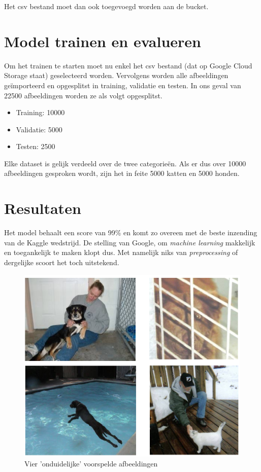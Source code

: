 Het csv bestand moet dan ook toegevoegd worden aan de bucket.

\section{Model trainen en evalueren}
\label{sec:google-automl-train}

Om het trainen te starten moet nu enkel het csv bestand (dat op Google Cloud Storage staat) geselecteerd worden. Vervolgens worden alle afbeeldingen geïmporteerd en opgesplitst in training, validatie en testen. In ons geval van 22500 afbeeldingen worden ze als volgt opgesplitst.

\begin{itemize}
    \item Training: 10000
    \item Validatie: 5000
    \item Testen: 2500
\end{itemize}

Elke dataset is gelijk verdeeld over de twee categorieën. Als er dus over 10000 afbeeldingen gesproken wordt, zijn het in feite 5000 katten en 5000 honden.

\section{Resultaten}
\label{sec:google-automl-results}

Het model behaalt een score van 99\% en komt zo overeen met de beste inzending van de Kaggle wedstrijd. De stelling van Google, om \textit{machine learning} makkelijk en toegankelijk te maken klopt dus. Met namelijk niks van \textit{preprocessing} of dergelijke scoort het toch uitstekend.

\begin{figure}
    \centering
    \includegraphics[width=\linewidth]{img/google-automl-pred.png}
    \caption{Vier 'onduidelijke' voorspelde afbeeldingen}
    \label{fig:google-predictions}
\end{figure}

